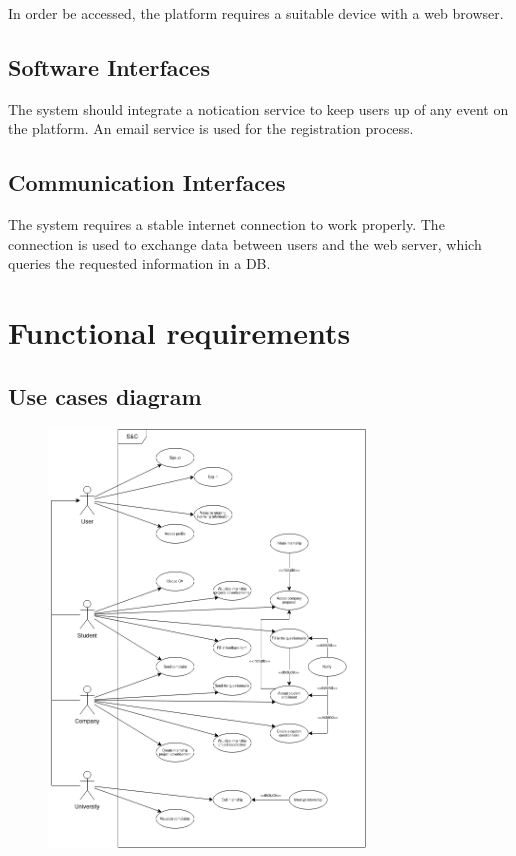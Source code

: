 In order be accessed, the platform requires a suitable device with a web browser.

\subsection{Software Interfaces}

The system should integrate a notication service to keep users up of any event on the platform.
An email service is used for the registration process.

\subsection{Communication Interfaces}

The system requires a stable internet connection to work properly.
The connection is used to exchange data between users and the web server, which queries the requested information in a DB.

\section{Functional requirements}

\subsection{Use cases diagram}

\begin{figure}[H]
    \centering
    \includegraphics[width=0.75\textwidth]{../../assets/use-cases-diagram.png}
\end{figure}

